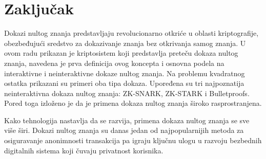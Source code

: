 \chapter{Zaklju\v cak}
 Dokazi nultog znanja predstavljaju revolucionarno otkri\' ce u oblasti kriptografije, obezbeđuju\' ci sredstvo za dokazivanje znanja bez otkrivanja samog znanja. U ovom radu prikazan je kriptosistem koji predstavlja preteču dokaza nultog znanja, navedena je prva definicija ovog koncepta i osnovna podela na interaktivne i neinteraktivne dokaze nultog znanja. Na problemu kvadratnog ostatka prikazani su primeri oba tipa dokaza. Upoređena su tri najpoznatija neinteraktivna dokaza nultog znanja: \textenglish{ZK-SNARK, ZK-STARK} i \textenglish{Bulletproofs}. Pored toga izloženo je da je primena dokaza nultog znanja \v siroko rasprostranjena.
 
  Kako tehnologija nastavlja da se razvija, primena dokaza nultog znanja se sve vi\v se \v siri. Dokazi nultog znanja su danas jedan od najpopularnijih metoda za osiguravanje anonimnosti transakcija pa igraju ključnu ulogu u razvoju bezbednih digitalnih sistema koji čuvaju privatnost korisnika.


